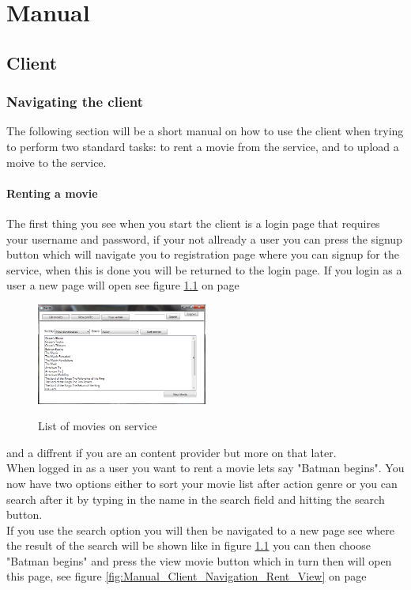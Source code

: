 \chapter{Manual}
\label{Manual}

\section{Client}
\label{Manual_Client}

\subsection{Navigating the client}
\label{Manual_Client_Navigation}
The following section will be a short manual on how to use the client when trying to perform two standard tasks: to rent a movie from the service, and to upload a moive to the service.

\subsubsection{Renting a movie}
\label{Manual_Client_Navigation_Rent}
The first thing you see when you start the client is a login page that requires your username and password, if your not allready a user you can press the signup button which will navigate you to registration page where you can signup for the service, when this is done you will be returned to the login page. If you login as a user a new page will open see figure \ref{fig:Manual_Client_Navigation_Rent_List} on page \pageref{fig:Manual_Client_Navigation_Rent_List}

\begin{figure}[h!] 
  \centering
 \includegraphics[width=0.5\textwidth]{Parts/Images/Manual/Listmovies}
\label{fig:Manual_Client_Navigation_Rent_List}
\caption{List of movies on service}
\end{figure}
 
and a diffrent if you are an content provider but more on that later.
\\When logged in as a user you want to rent a movie lets say "Batman begins". You now have two options either to sort your movie list after action genre or you can search after it by typing in the name in the search field and hitting the search button.
\\If you use the search option you will then be navigated to a new page see where the result of the search will be shown like in figure \ref{fig:Manual_Client_Navigation_Rent_List} you can then choose "Batman begins" and press the view movie button which in turn then will open this page, see figure \ref{fig:Manual_Client_Navigation_Rent_View} on page \pageref{fig:Manual_Client_Navigation_Rent_View}


